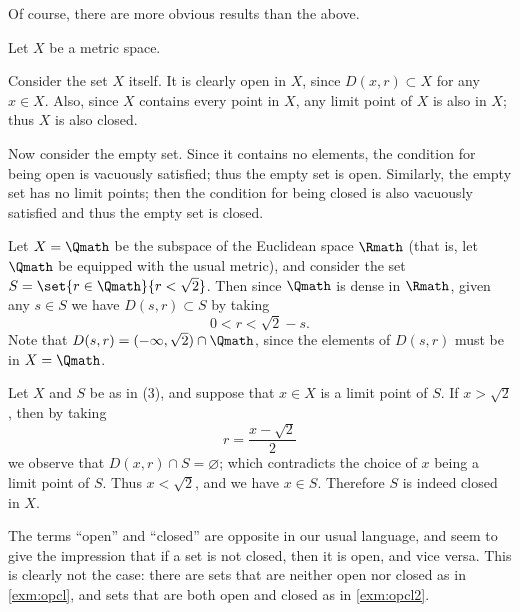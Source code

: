 Of course,
there are more obvious results than the above.

\begin{example}
    \label{exm:opcl2}
    Let \(X\) be a metric space.
    \begin{nlist}
        \item Consider the set \(X\) itself.
        It is clearly open in \(X\),
        since \(D(x,r)\subset X\) for any \(x\in X\).
        Also, since \(X\) contains every point in \(X\),
        any limit point of \(X\) is also in \(X\);
        thus \(X\) is also closed.

        \item Now consider the empty set.
        Since it contains no elements,
        the condition for being open is vacuously satisfied;
        thus the empty set is open.
        Similarly, the empty set has no limit points;
        then the condition for being closed is also vacuously satisfied
        and thus the empty set is closed.

        \item Let \(X=\Qmath\) be the subspace
        of the Euclidean space \(\Rmath\)
        (that is, let \(\Qmath\) be equipped with the usual metric),
        and consider the set \(S=\set{r\in\Qmath}{r<\sqrt 2}\).
        Then since \(\Qmath\) is dense in \(\Rmath\),
        given any \(s\in S\) we have \(D(s,r)\subset S\) by taking
        \[
            0<r<\sqrt 2-s.
        \]
        Note that \(D(s,r)=(-\infty,\sqrt 2)\cap\Qmath\),
        since the elements of \(D(s,r)\) must be in \(X=\Qmath\).

        \item Let \(X\) and \(S\) be as in (3),
        and suppose that \(x\in X\) is a limit point of \(S\).
        If \(x>\sqrt{2}\),
        then by taking
        \[
            r=\frac{x-\sqrt{2}}{2}
        \]
        we observe that \(D(x,r)\cap S=\varnothing\);
        which contradicts the choice of \(x\)
        being a limit point of \(S\).
        Thus \(x<\sqrt 2\), and we have \(x\in S\).
        Therefore \(S\) is indeed closed in \(X\).
    \end{nlist}
\end{example}

The terms ``open'' and ``closed'' are opposite in our usual language,
and seem to give the impression that
if a set is not closed, then it is open, and vice versa.
This is clearly not the case:
there are sets that are neither open nor closed as in \cref{exm:opcl},
and sets that are both open and closed as in \cref{exm:opcl2}.

